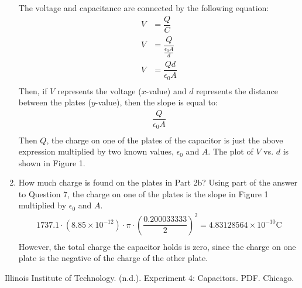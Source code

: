 \documentclass [12pt, letterpaper, twoside] {article}
\begin{document}
\begin{enumerate}
  The voltage and capacitance are connected by the following equation:
  \begin{equation}
    \begin{split}
      V &= \dfrac{Q}{C} \\
      V &= \dfrac{Q}{\tfrac{\epsilon_{0}A}{d}} \\
      V &= \dfrac{Qd}{\epsilon_{0}A} \\
    \end{split}
  \end{equation}
  Then, if \(V\) represents the voltage (\(x\)-value) and \(d\) represents the distance between the plates (\(y\)-value), then the slope is equal to:
  \begin{equation*}
    \begin{split}
      \dfrac{Q}{\epsilon_{0}A} \\
    \end{split}
  \end{equation*}
  Then \(Q\), the charge on one of the plates of the capacitor is just the above expression multiplied by two known values, \(\epsilon_{0}\) and \(A\). The plot of \(V\) vs. \(d\) is shown in Figure 1.
  \item How much charge is found on the plates in Part 2b?
  Using part of the answer to Question 7, the charge on one of the plates is the slope in Figure 1 multiplied by \(\epsilon_{0}\) and \(A\).
  \begin{equation*}
    \begin{split}
      1737.1\cdot(8.85\times10^{-12})\cdot\pi\cdot{\left(\dfrac{0.200033333}{2}\right)}^2 = 4.83128564\times10^{-10} \text{C} \\
    \end{split}
  \end{equation*}
  However, the total charge the capacitor holds is zero, since the charge on one plate is the negative of the charge of the other plate.
\end{enumerate}

\voltage

\begin {figure}
  \centering
  \caption {}
\end {figure}

  Illinois Institute of Technology. (n.d.). Experiment 4: Capacitors. PDF. Chicago.
\end{document}
